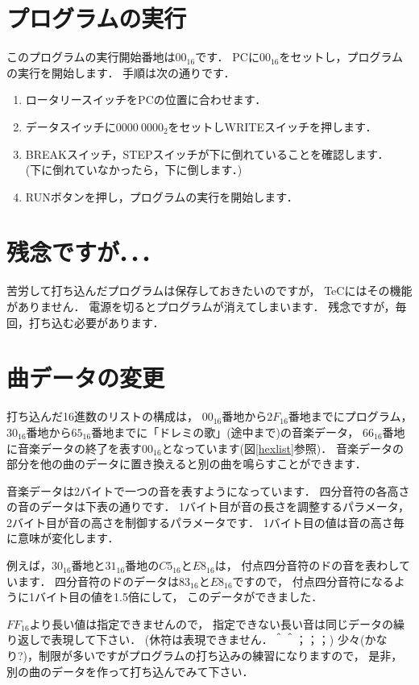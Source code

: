 \section{プログラムの実行}
このプログラムの実行開始番地は$00_{16}$です．
PCに$00_{16}$をセットし，プログラムの実行を開始します．
手順は次の通りです．
\begin{enumerate}
\item ロータリースイッチをPCの位置に合わせます．
\item データスイッチに$0000~0000_{2}$をセットしWRITEスイッチを押します．
\item BREAKスイッチ，STEPスイッチが下に倒れていることを確認します．\\
(下に倒れていなかったら，下に倒します．)
\item RUNボタンを押し，プログラムの実行を開始します．
\end{enumerate}

\section{残念ですが．．．}
苦労して打ち込んだプログラムは保存しておきたいのですが，
TeCにはその機能がありません．
電源を切るとプログラムが消えてしまいます．
残念ですが，毎回，打ち込む必要があります．

\section{曲データの変更}
打ち込んだ16進数のリストの構成は，
$00_{16}$番地から$2F_{16}$番地までにプログラム，
$30_{16}$番地から$65_{16}$番地までに「ドレミの歌」(途中まで)の音楽データ，
$66_{16}$番地に音楽データの終了を表す$00_{16}$となっています(図\ref{hexlist}参照)．
音楽データの部分を他の曲のデータに置き換えると別の曲を鳴らすことができます．

音楽データは2バイトで一つの音を表すようになっています．
四分音符の各高さの音のデータは下表の通りです．
1バイト目が音の長さを調整するパラメータ，
2バイト目が音の高さを制御するパラメータです．
1バイト目の値は音の高さ毎に意味が変化します．

例えば，$30_{16}$番地と$31_{16}$番地の$C5_{16}$と$E8_{16}$は，
付点四分音符のドの音を表わしています．
四分音符のドのデータは$83_{16}$と$E8_{16}$ですので，
付点四分音符になるように1バイト目の値を1.5倍にして，
このデータができました．

$FF_{16}$より長い値は指定できませんので，
指定できない長い音は同じデータの繰り返しで表現して下さい．
(休符は表現できません．＾＾；；；)
少々(かなり?)，制限が多いですがプログラムの打ち込みの練習になりますので，
是非，別の曲のデータを作って打ち込んでみて下さい．

